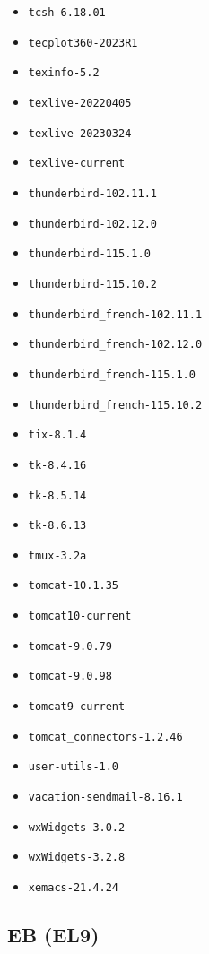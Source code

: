 \begin{multicols}{3}
\begin{itemize}
\item \verb|tcsh-6.18.01|
\item \verb|tecplot360-2023R1|
\item \verb|texinfo-5.2|
\item \verb|texlive-20220405|
\item \verb|texlive-20230324|
\item \verb|texlive-current|
\item \verb|thunderbird-102.11.1|
\item \verb|thunderbird-102.12.0|
\item \verb|thunderbird-115.1.0|
\item \verb|thunderbird-115.10.2|
\item \verb|thunderbird_french-102.11.1|
\item \verb|thunderbird_french-102.12.0|
\item \verb|thunderbird_french-115.1.0|
\item \verb|thunderbird_french-115.10.2|
\item \verb|tix-8.1.4|
\item \verb|tk-8.4.16|
\item \verb|tk-8.5.14|
\item \verb|tk-8.6.13|
\item \verb|tmux-3.2a|
\item \verb|tomcat-10.1.35|
\item \verb|tomcat10-current|
\item \verb|tomcat-9.0.79|
\item \verb|tomcat-9.0.98|
\item \verb|tomcat9-current|
\item \verb|tomcat_connectors-1.2.46|
\item \verb|user-utils-1.0|
\item \verb|vacation-sendmail-8.16.1|
\item \verb|wxWidgets-3.0.2|
\item \verb|wxWidgets-3.2.8|
\item \verb|xemacs-21.4.24|
\end{itemize}
\end{multicols}
\normalsize

\subsection{EB (EL9)}
\label{sect:software-eb}

